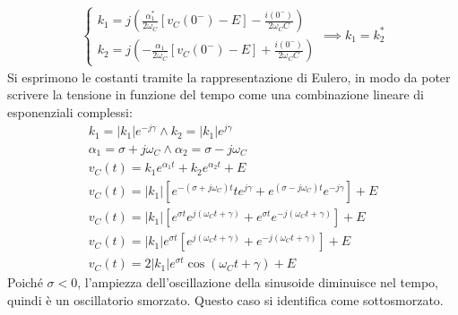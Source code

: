 \documentclass{article}
\numberwithin{equation}{subsection}
\begin{document}
\begin{gather*}
    \begin{cases}
        k_1=j\left(\displaystyle\frac{\alpha_1^*}{2\omega_C}[v_C(0^-)-E]-\frac{i(0^-)}{2\omega_CC}\right)\\
        k_2=j\left(\displaystyle-\frac{\alpha_1}{2\omega_C}[v_C(0^-)-E]+\frac{i(0^-)}{2\omega_CC}\right)
    \end{cases}\implies k_1=k_2^*
\end{gather*}
Si esprimono le costanti tramite la rappresentazione di Eulero, in modo da poter scrivere la tensione in funzione del tempo come una combinazione lineare di esponenziali 
complessi:
\begin{gather*}
    k_1=|k_1|e^{-j\gamma}\land k_2=|k_1|e^{j\gamma}\\
    \alpha_1=\sigma+j\omega_C\land \alpha_2=\sigma-j\omega_C\\
    v_C(t)=k_1e^{\alpha_1t}+k_2e^{\alpha_2t}+E\\
    v_C(t)=|k_1|\left[e^{-(\sigma+j\omega_C)t}te^{j\gamma}+e^{(\sigma-j\omega_C)t}e^{-j\gamma}\right]+E\\
    v_C(t)=|k_1|\left[e^{\sigma t}e^{j(\omega_Ct+\gamma)}+e^{\sigma t}e^{-j(\omega_Ct+\gamma)}\right]+E\\
    v_C(t)=|k_1|e^{\sigma t}\left[e^{j(\omega_Ct+\gamma)}+e^{-j(\omega_Ct+\gamma)}\right]+E\\
    v_C(t)=2|k_1|e^{\sigma t}\cos(\omega_Ct+\gamma)+E
\end{gather*}
Poiché $\sigma<0$, l'ampiezza dell'oscillazione della sinusoide diminuisce nel tempo, quindi è un oscillatorio smorzato. Questo caso si identifica come sottosmorzato. 
\end{document}
